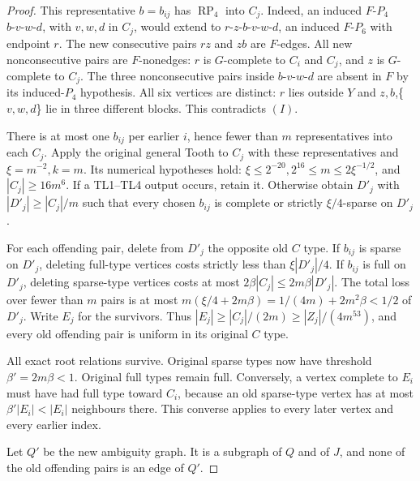 \documentclass[11pt,a4paper]{article}
\theoremstyle{definition}
\theoremstyle{remark}
\numberwithin{equation}{section}
\begin{document}
\begin{proof}
This representative \(b=b_{ij}\) has \(\operatorname{RP}_{4}\) into \(C_{j}\). Indeed, an induced \(F\text{-}P_{4}\) \(b\text{-}v\text{-}w\text{-}d\), with \(v,\allowbreak w,\allowbreak d\) in \(C_{j}\), would extend to \(r\text{-}z\text{-}b\text{-}v\text{-}w\text{-}d\), an induced \(F\text{-}P_{6}\) with endpoint \(r\). The new consecutive pairs \(rz\) and \(zb\) are \(F\)-edges. All new nonconsecutive pairs are \(F\)-nonedges: \(r\) is \(G\)-complete to \(C_{i}\) and \(C_{j}\), and \(z\) is \(G\)-complete to \(C_{j}\). The three nonconsecutive pairs inside \(b\text{-}v\text{-}w\text{-}d\) are absent in \(F\) by its induced-\(P_{4}\) hypothesis. All six vertices are distinct: \(r\) lies outside \(Y\) and \(z,\allowbreak b\),\{\(v,\allowbreak w,\allowbreak d\)\} lie in three different blocks. This contradicts \((I)\).

There is at most one \(b_{ij}\) per earlier \(i\), hence fewer than \(m\) representatives into each \(C_{j}\). Apply the original general Tooth to \(C_{j}\) with these representatives and \(\xi=m^{-2},\allowbreak  k=m\). Its numerical hypotheses hold: \(\xi\le\allowbreak 2^{-20},\allowbreak  2^{16}\le\allowbreak m\le\allowbreak 2\xi^{-1/2}\), and \(|C_{j}|\ge\allowbreak 16m^{6}\). If a TL1--TL4 output occurs, retain it. Otherwise obtain \(D'_{j}\) with \(|D'_{j}|\ge\allowbreak |C_{j}|/m\) such that every chosen \(b_{ij}\) is complete or strictly \(\xi/4\)-sparse on \(D'_{j}\).

For each offending pair, delete from \(D'_{j}\) the opposite old \(C\) type. If \(b_{ij}\) is sparse on \(D'_{j}\), deleting full-type vertices costs strictly less than \(\xi |D'_{j}|/4\). If \(b_{ij}\) is full on \(D'_{j}\), deleting sparse-type vertices costs at most \(2 \beta |C_{j}| \le\allowbreak  2m \beta |D'_{j}|\). The total loss over fewer than \(m\) pairs is at most \(m(\xi/4+2m \beta) =1/(4m)+2m^{2} \beta < 1/2\) of \(D'_{j}\). Write \(E_{j}\) for the survivors. Thus \(|E_{j}|\ge\allowbreak |C_{j}|/(2m)\ge\allowbreak |Z_{j}|/(4m^{53})\), and every old offending pair is uniform in its original \(C\) type.

All exact root relations survive. Original sparse types now have threshold \(\beta'=2m \beta <1\). Original full types remain full. Conversely, a vertex complete to \(E_{i}\) must have had full type toward \(C_{i}\), because an old sparse-type vertex has at most \(\beta' |E_{i}|<|E_{i}|\) neighbours there. This converse applies to every later vertex and every earlier index.

Let \(Q'\) be the new ambiguity graph. It is a subgraph of \(Q\) and of \(J\), and none of the old offending pairs is an edge of \(Q'\).

\end{proof}
\end{document}

